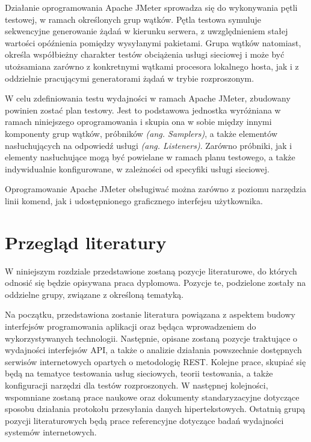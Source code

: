 Działanie oprogramowania Apache JMeter sprowadza się do wykonywania pętli testowej, w ramach określonych grup wątków. Pętla testowa symuluje sekwencyjne generowanie żądań w kierunku serwera, z uwzględnieniem stałej wartości opóźnienia pomiędzy wysyłanymi pakietami. Grupa wątków natomiast, określa współbieżny charakter testów obciążenia usługi sieciowej i może być utożsamiana zarówno z konkretnymi wątkami procesora lokalnego hosta, jak i z oddzielnie pracującymi generatorami żądań w trybie rozproszonym.

W celu zdefiniowania testu wydajności w ramach Apache JMeter, zbudowany powinien zostać plan testowy. Jest to podstawowa jednostka wyróżniana w ramach niniejszego oprogramowania i skupia ona w sobie między innymi komponenty grup wątków, próbników \textit{(ang. Samplers)}, a także elementów nasłuchujących na odpowiedź usługi \textit{(ang. Listeners)}. Zarówno próbniki, jak i elementy nasłuchujące mogą być powielane w ramach planu testowego, a także indywidualnie konfigurowane, w zależności od specyfiki usługi sieciowej.

Oprogramowanie Apache JMeter obsługiwać można zarówno z poziomu narzędzia linii komend, jak i udostępnionego graficznego interfejsu użytkownika. 
\section{Przegląd literatury}
W niniejszym rozdziale przedstawione zostaną pozycje literaturowe, do których odnosić się będzie opisywana praca dyplomowa. Pozycje te, podzielone zostały na oddzielne grupy, związane z określoną tematyką.

Na początku, przedstawiona zostanie literatura powiązana z aspektem budowy interfejsów programowania aplikacji oraz będąca wprowadzeniem do wykorzystywanych technologii. Następnie, opisane zostaną pozycje traktujące o wydajności interfejsów API, a także o analizie działania powszechnie dostępnych serwisów internetowych opartych o metodologię REST. Kolejne prace, skupiać się będą na tematyce testowania usług sieciowych, teorii testowania, a także konfiguracji narzędzi dla testów rozproszonych. W następnej kolejności, wspomniane zostaną prace naukowe oraz dokumenty standaryzacyjne dotyczące sposobu działania protokołu przesyłania danych hipertekstowych. Ostatnią grupą pozycji literaturowych będą prace referencyjne dotyczące badań wydajności systemów internetowych.

